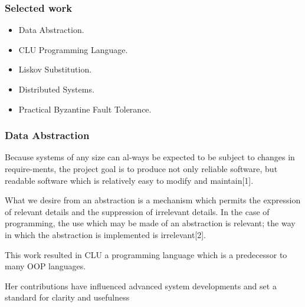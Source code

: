 \documentclass{beamer}
\begin{document}

\begin{frame}
\frametitle{Selected work}
\begin{itemize}
\item Data Abstraction.
\item CLU Programming Language.
\item Liskov Substitution.
\item Distributed Systems.
\item Practical Byzantine Fault Tolerance.
\end{itemize}
\end{frame}


\begin{frame}
\frametitle{Data Abstraction}
Because  systems  of  any  size  can  al-ways  be  expected  to  be  subject  to  changes  in  require-ments,  the  project  goal  is  to  produce  not  only  reliable  software,  but  readable  software  which  is relatively  easy  to  modify  and  maintain[1].

\vspace{5mm}

What we desire from an abstraction is a mechanism which permits the expression of relevant details and the suppression of irrelevant details. In the case of programming, the use which may be made of an abstraction is relevant; the way in which the abstraction is implemented is irrelevant[2]. 

\vspace{5mm}

This work resulted in CLU a programming language which is a predecessor to many OOP languages.

\vspace{5mm}

Her contributions have influenced advanced system developments and set a standard for clarity and usefulness

\end{frame}
\end{document}
